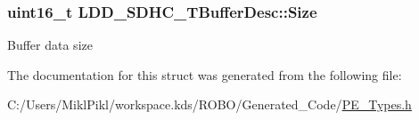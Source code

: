 \subsubsection[{Size}]{\setlength{\rightskip}{0pt plus 5cm}uint16\+\_\+t L\+D\+D\+\_\+\+S\+D\+H\+C\+\_\+\+T\+Buffer\+Desc\+::\+Size}\label{struct_l_d_d___s_d_h_c___t_buffer_desc_a117f5acff1ada72194a95b38795bca56}
Buffer data size 

The documentation for this struct was generated from the following file\+:\begin{DoxyCompactItemize}
\item 
C\+:/\+Users/\+Mikl\+Pikl/workspace.\+kds/\+R\+O\+B\+O/\+Generated\+\_\+\+Code/\hyperlink{_p_e___types_8h}{P\+E\+\_\+\+Types.\+h}\end{DoxyCompactItemize}
